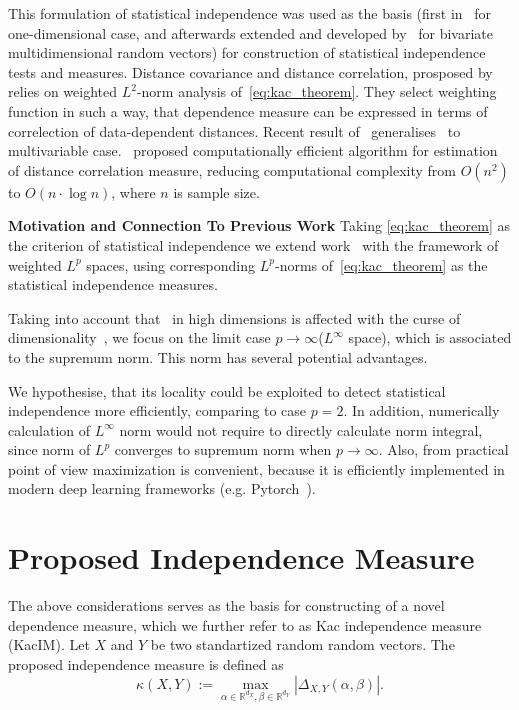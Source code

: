 \documentclass{article}
\begin{document}
This formulation of statistical independence was used as the basis (first in~\cite{Feuerverger} for one-dimensional case, and afterwards extended and developed by~\cite{Szekely} for bivariate multidimensional random vectors) for construction of statistical independence tests and measures. Distance covariance and distance correlation, prosposed by ~\cite{Szekely} relies on weighted $L^{2}$-norm analysis of~\eqref{eq:kac_theorem}. They select weighting function in such a way, that dependence measure can be expressed in terms of correlection of data-dependent distances. Recent result of~\cite{Bottcher} generalises~\cite{Szekely} to multivariable case.~\cite{CHAUDHURI201915} proposed computationally efficient algorithm for estimation of distance correlation measure, reducing computational complexity from $O(n^2)$ to $O(n\cdot \log n)$, where $n$ is sample size.

\textbf{Motivation and Connection To Previous Work} Taking \eqref{eq:kac_theorem} as the criterion of statistical independence we extend work~\cite{Szekely} with the framework of weighted $L^{p}$ spaces, using corresponding $L^{p}$-norms of~\eqref{eq:kac_theorem} as the statistical independence measures. 

Taking into account that~\cite{Szekely} in high dimensions is affected with the curse of dimensionality~\cite{Edlemann}, we focus on the limit case $p \rightarrow \infty$($L^{\infty}$ space), which is associated to the supremum norm. This norm has several potential advantages.


 
We hypothesise, that its locality could be exploited to detect statistical independence more efficiently, comparing to case $p=2$. 
In addition, numerically calculation of $L^{\infty} $ norm would not require to directly calculate norm integral, since norm of $L^{p}$ converges to supremum norm when $p \rightarrow \infty$. Also, from practical point of view maximization is convenient, because it is efficiently implemented in modern deep learning frameworks (e.g. Pytorch~\cite{NEURIPS2019_9015}).


\section{Proposed Independence Measure}
\label{section:proposed_method}



\noindent The above considerations serves as the basis for constructing of a novel dependence measure, which we further refer to as Kac independence measure (KacIM). Let $X$ and $Y$ be two standartized random random vectors. The proposed independence measure is defined as
\begin{equation}
\label{eq:kim}
    \kappa(X,Y):= \max_{\alpha \in \mathbb{R}^{d_{X}}, \beta \in \mathbb{R}^{d_{Y}}} |\Delta_{X,Y}(\alpha,\beta)|.
\end{equation}
\end{document}
